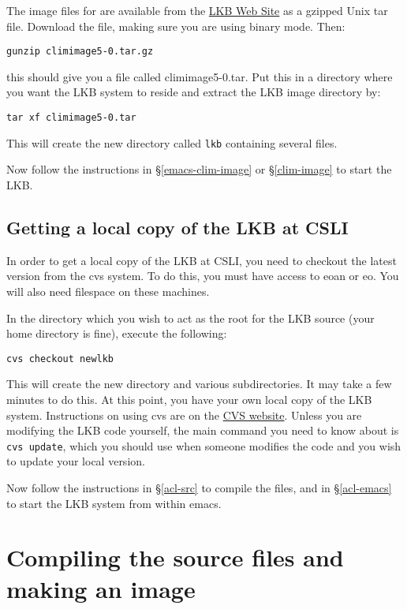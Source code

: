 \documentclass[12pt]{report}
\begin{document}
The image files for are available from the
\href{http://www-csli.stanford.edu/~aac/lkb.html}{LKB Web Site}
as a gzipped Unix tar file.
Download the file, making sure you are using binary mode.
Then:
\begin{verbatim}
gunzip climimage5-0.tar.gz
\end{verbatim}
this should give you a file called climimage5-0.tar.
Put this in a directory where you want the LKB system to reside
and extract the LKB image directory by:
\begin{verbatim}
tar xf climimage5-0.tar
\end{verbatim}
This will create the new directory called {\tt lkb} containing
several files. 

Now follow the instructions in \S\ref{emacs-clim-image}
or \S\ref{clim-image}
to start the LKB.

\subsection{Getting a local copy of the LKB at CSLI}
\label{down-csli}

In order to get a local copy of the LKB at CSLI, you need to
checkout the latest version from the cvs system.  To do this,
you must have access to eoan or eo.  You will also need filespace
on these machines.

In the directory which you wish to act as the root for the LKB source
(your home directory is fine), execute the following:
\begin{verbatim}
cvs checkout newlkb
\end{verbatim}
This will create the new directory and various subdirectories.
It may take a few minutes to do this.  At this point, you have 
your own local copy of the LKB system.  Instructions on using
cvs are on the
\href{http://www.loria.fr/~molli/cvs/doc/cvs_toc.html}{CVS website}. 
Unless you are modifying the LKB
code yourself, the main command you need
to know about is \verb+cvs update+, which you should use
when someone modifies the code and you wish to update your local version.

Now follow the instructions in \S\ref{acl-src} to compile the
files, and in \S\ref{acl-emacs} to start the LKB system from within
emacs.


\section{Compiling the source files and making an image}
\label{src}
\end{document}
